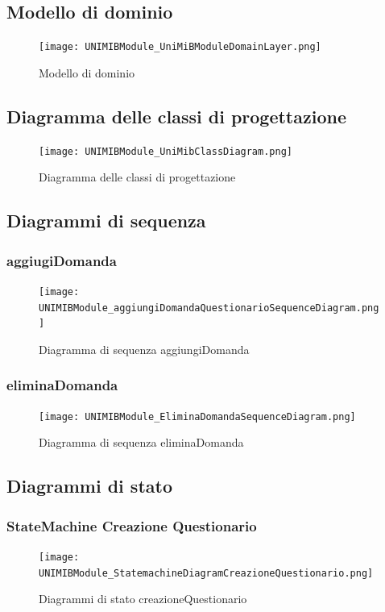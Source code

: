 \documentclass[12pt]{article}
\begin{document}
	
	
	\subsection{Modello di dominio}
	\begin{figure}[H]
		\centering
		\texttt{[image: UNIMIBModule\_UniMiBModuleDomainLayer.png]}
		\caption{Modello di dominio}
	\end{figure}
	\subsection{Diagramma delle classi di progettazione}
	\begin{figure}[H]
		\centering
		\texttt{[image: UNIMIBModule\_UniMibClassDiagram.png]}
		\caption{Diagramma delle classi di progettazione}
	\end{figure}
	\subsection{Diagrammi di sequenza}
	\subsubsection{aggiugiDomanda}
	\begin{figure}[H]
		\centering
		\texttt{[image: UNIMIBModule\_aggiungiDomandaQuestionarioSequenceDiagram.png]}
		\caption{Diagramma di sequenza aggiungiDomanda}
	\end{figure}
	\subsubsection{eliminaDomanda}
	\begin{figure}[H]
		\centering
		\texttt{[image: UNIMIBModule\_EliminaDomandaSequenceDiagram.png]}
		\caption{Diagramma di sequenza eliminaDomanda}
	\end{figure}
	\subsection{Diagrammi di stato}
	\subsubsection{StateMachine Creazione Questionario}
	\begin{figure}[H]
		\centering
		\texttt{[image: UNIMIBModule\_StatemachineDiagramCreazioneQuestionario.png]}
		\caption{Diagrammi di stato creazioneQuestionario}
	\end{figure}
\end{document}
